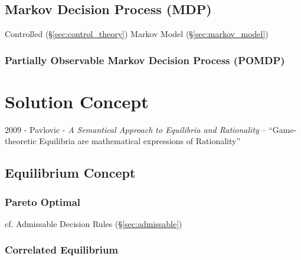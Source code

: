 \subsection{Markov Decision Process (MDP)}\label{sec:mdp}

Controlled (\S\ref{sec:control_theory}) Markov Model (\S\ref{sec:markov_model})



\subsubsection{Partially Observable Markov Decision Process (POMDP)}
\label{sec:pomdp}



\section{Solution Concept}\label{sec:solution_concept}

2009 - Pavlovic - \emph{A Semantical Approach to Equilibria and Rationality} --
``Game-theoretic Equilibria are mathematical expressions of Rationality''



\subsection{Equilibrium Concept}\label{sec:equilibrium_concept}

\subsubsection{Pareto Optimal}\label{sec:pareto_optimal}

\fist cf. Admissable Decision Rules (\S\ref{sec:admissable})



\subsubsection{Correlated Equilibrium}\label{sec:correlated_equilibrium}

